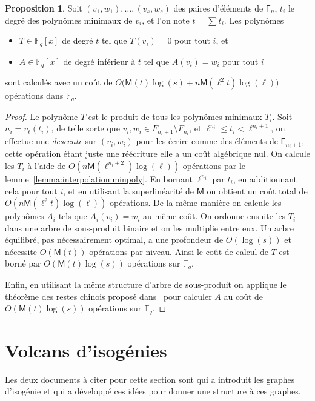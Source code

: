 \documentclass[10pt,a4paper]{book}
\theoremstyle{plain}
\theoremstyle{definition}
\theoremstyle{definition}
\theoremstyle{definition}
\theoremstyle{definition}
\newtheorem{prop}[thm]{Proposition}
\theoremstyle{definition}
\theoremstyle{remark}
\theoremstyle{remark}
\theoremstyle{definition}
\begin{document}
\begin{prop}\label{prop:interpol}
  Soit $(v_1,w_1),\dots,(v_s,w_s)$ des paires d'éléments de $\mathsf{F}_n$, 
  $t_i$ le degré des polynômes minimaux de $v_i$, et l'on note  $t=\sum t_i$. 
  Les polynômes
  \begin{itemize}
  \item $T\in \mathbb{F}_q[x]$ de degré $t$ tel que $T(v_i)=0$ pour tout $i$,
    et
  \item $A\in \mathbb{F}_q[x]$ de degré inférieur à $t$ tel que $A(v_i)=w_i$ pour
    tout $i$
  \end{itemize}
  sont calculés avec un coût de
  $O\bigl(\mathsf{M}(t)\log(s) + n\mathsf{M}(\ell^2t)\log(\ell)\bigr)$ opérations dans $\mathbb{F}_q$.
\end{prop}
\begin{proof}
  Le polynôme $T$ est le produit de tous les polynômes minimaux $T_i$. Soit 
  $n_i=v_\ell(t_i)$, de telle sorte que $v_i,w_i\in F_{n_i+1}\setminus F_{n_i}$,
  et $\ell^{n_i}\leqslant t_i<\ell^{n_i+1}$,
  on effectue une \emph{descente} sur $(v_i,w_i)$ pour les écrire comme des 
  éléments de $\mathsf{F}_{n_i+1}$, cette opération étant juste une réécriture
  elle a un coût algébrique nul. On calcule les $T_i$ à l'aide de
   $O(n\mathsf{M}(\ell^{n_i+2})\log(\ell))$ opérations par 
   le lemme~\ref{lemma:interpolation:minpoly}. En bornant 
  $\ell^{n_i}$ par $t_i$, en additionnant cela pour tout $i$, et en utilisant 
  la superlinéarité de $\mathsf{M}$ on obtient un coût total de 
  $O(n\mathsf{M}(\ell^2t)\log(\ell))$ opérations.
  De la même manière on calcule les polynômes $A_i$ tels que $A_i(v_i)=w_i$
  au même coût.
  On ordonne ensuite les $T_i$ dans une arbre de sous-produit binaire et 
  on les multiplie entre eux. Un arbre équilibré, pas nécessairement optimal,
  a une profondeur de $O(\log (s))$ et nécessite $O(\mathsf{M}(t))$ opérations
   par niveau. Ainsi le coût de calcul de $T$ est borné par 
   $O(\mathsf{M}(t)\log(s))$ opérations sur $\mathbb{F}_q$.
  
  Enfin, en utilisant la même structure d'arbre de sous-produit on applique le 
  théorème des restes chinois proposé dans~\cite[Chapter~10]{vzGJG03} pour 
  calculer $A$ au coût de $O(\mathsf{M}(t)\log(s))$ opérations sur $\mathbb{F}_q$.
\end{proof}




\chapter{Volcans d'isog\'enies}
\label{cha:volc:iso}
Les deux documents à citer pour cette section sont \cite{Kohel96} qui a introduit les graphes d'isogénie et \cite{Fouquet01} qui a développé ces idées pour donner une structure à ces graphes.
\end{document}
